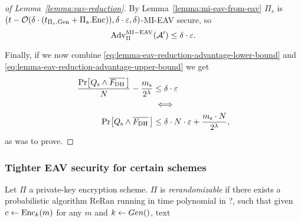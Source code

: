 \begin{proof}[of Lemma~\ref{lemma:eav-reduction}]
	By Lemma~\ref{lemma:mi-eav-from-eav} $\Pi_s$ is $(t - \mathcal{O}(\delta \cdot (t_{\Pi_s.\mathrm{Gen}} + \Pi_s.\mathrm{Enc})), \delta \cdot \varepsilon, \delta)$-MI-EAV secure, so
	\begin{equation} \label{eq:lemma-eav-reduction-advantage-upper-bound}
		\mathrm{Adv}_{\Pi}^{\mathrm{MI-EAV}}(\mathcal{A}') \le \delta \cdot \varepsilon.
	\end{equation}

	Finally, if we now combine \eqref{eq:lemma-eav-reduction-advantage-lower-bound} and \eqref{eq:lemma-eav-reduction-advantage-upper-bound} we get
	\begin{align*}
		\frac{\pr{\qs \land \overline{\fdh}\,}}{N} - \frac{\ms}{2^\lambda} & \le \delta \cdot \epsilon                                          \\
		                                                                   & \iff                                                               \\
		\pr{\qs \land \overline{\fdh}\,}                                   & \le \delta \cdot N \cdot \epsilon + \frac{\ms \cdot N}{2^\lambda},
	\end{align*}
	as was to prove.
\end{proof}

\subsubsection{Tighter EAV security for certain schemes}

\begin{definition}[Rerandomizability]
	Let $\Pi$ a private-key encryption scheme. $\Pi$ is \emph{rerandomizable} if there exists a probabilistic algorithm $\mathrm{ReRan}$ running in time polynomial in ?, such that given $c \leftarrow \mathrm{Enc}_k(m)$ for any $m$ and $k \leftarrow Gen()$, $\mathrm{text}$
\end{definition}

\begin{lemma}

\end{lemma}
